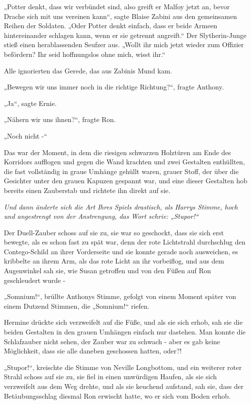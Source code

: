 {„Potter denkt, dass wir verbündet sind, also greift er Malfoy jetzt an, bevor Drache sich mit uns vereinen kann“, sagte Blaise Zabini aus den gemeinsamen Reihen der Soldaten. „Oder Potter denkt einfach, dass er beide Armeen hintereinander schlagen kann, wenn er sie getrennt angreift.“ Der Slytherin-Junge stieß einen herablassenden Seufzer aus. „Wollt ihr mich jetzt wieder zum Offizier befördern? Ihr seid hoffnungslos ohne mich, wisst ihr.“

Alle ignorierten das Gerede, das aus Zabinis Mund kam.

„Bewegen wir uns immer noch in die richtige Richtung?“, fragte Anthony.

„Ja“, sagte Ernie.

„Nähern wir uns ihnen?“, fragte Ron.

„Noch nicht -“

Das war der Moment, in dem die riesigen schwarzen Holztüren am Ende des Korridors aufflogen und gegen die Wand krachten und zwei Gestalten enthüllten, die fast vollständig in graue Umhänge gehüllt waren, grauer Stoff, der über die Gesichter unter den grauen Kapuzen gespannt war, und eine dieser Gestalten hob bereits einen Zauberstab und richtete ihn direkt auf sie.

\emph{Und dann änderte sich die Art Ihres Spiels drastisch, als Harrys Stimme, hoch und angestrengt von der Anstrengung, das Wort schrie: „Stupor!“}

Der Duell-Zauber schoss auf sie zu, sie war so geschockt, dass sie sich erst bewegte, als es schon fast zu spät war, denn der rote Lichtstrahl durchschlug den Contego-Schild an ihrer Vorderseite und sie konnte gerade noch ausweichen, es kribbelte an ihrem Arm, als das rote Licht an ihr vorbeiflog, und aus dem Augenwinkel sah sie, wie Susan getroffen und von den Füßen auf Ron geschleudert wurde -

„Somnium!“, brüllte Anthonys Stimme, gefolgt von einem Moment später von einem Dutzend Stimmen, die „Somnium!“ riefen.

Hermine drückte sich verzweifelt auf die Füße, und als sie sich erhob, sah sie die beiden Gestalten in den grauen Umhängen einfach nur dastehen. Man konnte die Schlafzauber nicht sehen, der Zauber war zu schwach - aber es gab keine Möglichkeit, dass sie alle daneben geschossen hatten, oder?!

„Stupor!“, kreischte die Stimme von Neville Longbottom, und ein weiterer roter Strahl schoss auf sie zu, sie fiel in einen unwürdigen Haufen, als sie sich verzweifelt aus dem Weg drehte, und als sie keuchend aufstand, sah sie, dass der Betäubungsschlag diesmal Ron erwischt hatte, wo er sich vom Boden erhob.

}
